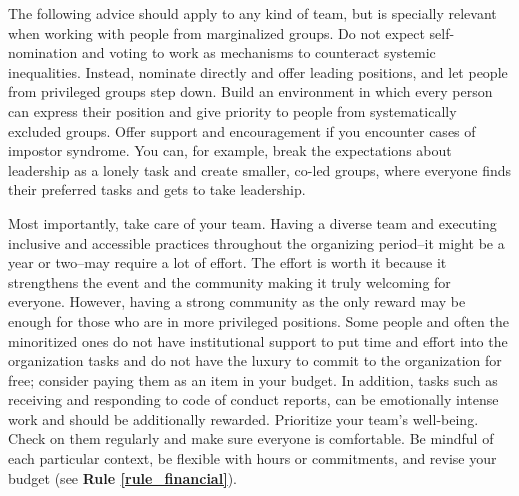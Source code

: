 \documentclass[10pt,letterpaper]{article}
\begin{document}
The following advice should apply to any kind of team, but is specially relevant when working with people from marginalized groups. 
Do not expect self-nomination and voting to work as mechanisms to counteract systemic inequalities. Instead, nominate directly and offer leading positions, and let people from privileged groups step down.
Build an environment in which every person can express their position and give priority to people from systematically excluded groups.
Offer support and encouragement if you encounter cases of impostor syndrome. 
You can, for example, break the expectations about leadership as a lonely task and create smaller, co-led groups, where everyone finds their preferred tasks and gets to take leadership. 

Most importantly, take care of your team. 
Having a diverse team and executing inclusive and accessible practices throughout the organizing period--it might be a year or two--may require a lot of effort. 
The effort is worth it because it strengthens the event and the community making it truly welcoming for everyone. 
However, having a strong community as the only reward may be enough for those who are in more privileged positions. 
Some people and often the minoritized ones do not have institutional support to put time and effort into the organization tasks and do not have the luxury to commit to the organization for free; consider paying them as an item in your budget.  
In addition, tasks such as receiving and responding to code of conduct reports, can be emotionally intense work and should be additionally rewarded.
Prioritize your team's well-being. Check on them regularly and make sure everyone is comfortable. 
Be mindful of each particular context, be flexible with hours or commitments, and revise your budget (see \textbf{Rule \ref{rule_financial}}). 

\end{document}
